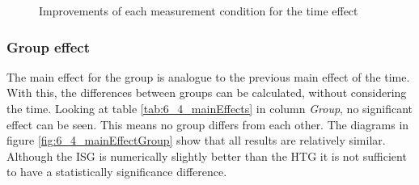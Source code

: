 \begin{figure}[htb]
\begin{minipage}[t]{0.32\linewidth}
		\label{fig:6_4_distanceAllDiff}
	\end{minipage}
	\caption{Improvements of each measurement condition for the time effect}
	\label{fig:6_4_timeImprovement}
\end{figure}

\subsubsection{Group effect}
The main effect for the group is analogue to the previous main effect of the time.
With this, the differences between groups can be calculated, without considering the time.
Looking at table \ref{tab:6_4_mainEffects} in column \textit{Group}, no significant effect can be seen.
This means no group differs from each other.
The diagrams in figure \ref{fig:6_4_mainEffectGroup} show that all results are relatively similar.
Although the ISG is numerically slightly better than the HTG it is not sufficient to have a statistically significance difference.
